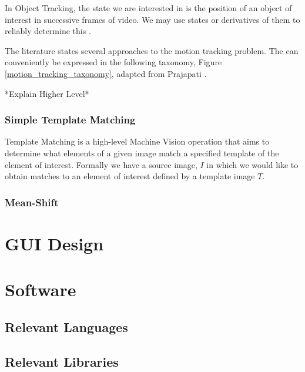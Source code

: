 In Object Tracking, the state we are interested in is the position of an object
of interest in successive frames of video. We may use states or derivatives of
them to reliably determine this \cite{Forsyth2012}.

The literature states several approaches to the motion tracking problem. The can
conveniently be expressed in the following taxonomy, Figure \ref{motion_tracking_taxonomy},
adapted from Prajapati \cite{Prajapati2015}.


*Explain Higher Level*

\subsubsection{Simple Template Matching}
Template Matching is a high-level Machine Vision operation that aims to determine
what elements of a given image match a specified template of the element of
interest.
Formally we have a source image, $I$ in which we would like to obtain matches to
an element of interest defined by a template image $T$.

\subsubsection{Mean-Shift} \label{literature_review_mean_shift}


\section{GUI Design}

\section{Software}

\subsection{Relevant Languages}

\subsection{Relevant Libraries}




